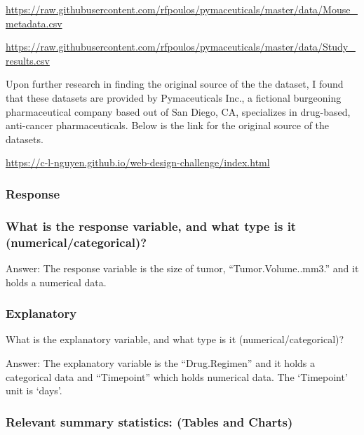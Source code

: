 \documentclass[
]{article}
\begin{document}
\url{https://raw.githubusercontent.com/rfpoulos/pymaceuticals/master/data/Mouse_metadata.csv}

\url{https://raw.githubusercontent.com/rfpoulos/pymaceuticals/master/data/Study_results.csv}

Upon further research in finding the original source of the the dataset,
I found that these datasets are provided by Pymaceuticals Inc., a
fictional burgeoning pharmaceutical company based out of San Diego, CA,
specializes in drug-based, anti-cancer pharmaceuticals. Below is the
link for the original source of the datasets.

\url{https://c-l-nguyen.github.io/web-design-challenge/index.html}

\hypertarget{response}{%
\subsubsection{Response}\label{response}}

\hypertarget{what-is-the-response-variable-and-what-type-is-it-numericalcategorical}{%
\subsubsection{What is the response variable, and what type is it
(numerical/categorical)?}\label{what-is-the-response-variable-and-what-type-is-it-numericalcategorical}}

Answer: The response variable is the size of tumor,
``Tumor.Volume..mm3.'' and it holds a numerical data.

\hypertarget{explanatory}{%
\subsubsection{Explanatory}\label{explanatory}}

What is the explanatory variable, and what type is it
(numerical/categorical)?

Answer: The explanatory variable is the ``Drug.Regimen'' and it holds a
categorical data and ``Timepoint'' which holds numerical data. The
`Timepoint' unit is `days'.

\hypertarget{relevant-summary-statistics-tables-and-charts}{%
\subsubsection{Relevant summary statistics: (Tables and
Charts)}\label{relevant-summary-statistics-tables-and-charts}}
\end{document}
